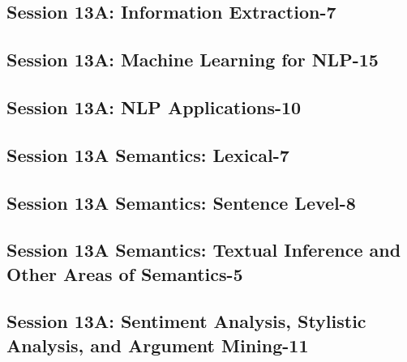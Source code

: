 \subsection{\large Session 13A: Information Extraction-7}
\label{parallel-session-13A-trackB}
\TrackBLoc\hfill\sessionchair{}{}
\clearpage
\subsection{\large Session 13A: Machine Learning for NLP-15}
\label{parallel-session-13A-trackC}
\TrackCLoc\hfill\sessionchair{}{}
\clearpage
\subsection{\large Session 13A: NLP Applications-10}
\label{parallel-session-13A-trackD}
\TrackDLoc\hfill\sessionchair{}{}
\clearpage
\subsection{\large Session 13A Semantics: Lexical-7}
\label{parallel-session-13A-trackE}
\TrackELoc\hfill\sessionchair{}{}
\clearpage
\subsection{\large Session 13A Semantics: Sentence Level-8}
\label{parallel-session-13A-trackF}
\TrackFLoc\hfill\sessionchair{}{}
\clearpage
\subsection{\large Session 13A Semantics: Textual Inference and Other Areas of Semantics-5}
\label{parallel-session-13A-trackG}
\TrackGLoc\hfill\sessionchair{}{}
\clearpage
\subsection{\large Session 13A: Sentiment Analysis, Stylistic Analysis, and Argument Mining-11}
\label{parallel-session-13A-trackH}
\TrackHLoc\hfill\sessionchair{}{}
\clearpage


